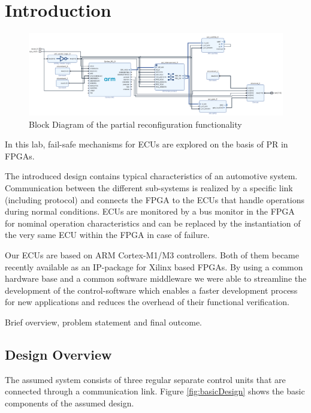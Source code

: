 \section{Introduction}
\begin{figure}[t]
    \centering
    \includegraphics[width=\textwidth]{figures/pr_blockDesign.pdf}
    \caption{Block Diagram of the partial reconfiguration functionality}\label{fig:prBlockDesign}
\end{figure}

In this lab, fail-safe mechanisms for \glspl{ECU} are explored on the basis of \gls{PR} in \glspl{FPGA}.

The introduced design contains typical characteristics of an automotive system.
Communication between the different sub-systems is realized by a specific link (including protocol) and connects the \gls{FPGA} to the \glspl{ECU} that handle operations during normal conditions. 
\glspl{ECU} are monitored by a bus monitor in the \gls{FPGA} for nominal operation characteristics and can be replaced by the instantiation of the very same \gls{ECU} within the \gls{FPGA} in case of failure.

Our \glspl{ECU} are based on ARM Cortex-M1/M3 controllers. Both of them became recently available as an \gls{IP}-package for Xilinx based \glspl{FPGA}.
By using a common hardware base and a common software middleware we were able to streamline the development of the control-software which enables a faster development process for new applications and reduces the overhead of their functional verification.
 
Brief overview, problem statement and final outcome.

\subsection{Design Overview}

The assumed system consists of three regular separate control units that are connected through a communication link. Figure \ref{fig:basicDesign} shows the basic components of the assumed design.

